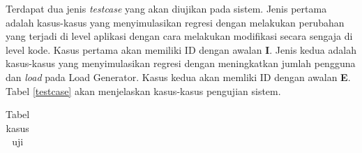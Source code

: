 Terdapat dua jenis \textit{testcase} yang akan diujikan pada sistem. Jenis pertama adalah kasus-kasus yang menyimulasikan regresi dengan melakukan perubahan yang terjadi di level aplikasi dengan cara melakukan modifikasi secara sengaja di level kode. Kasus pertama akan memiliki ID dengan awalan \textbf{I}. Jenis kedua adalah kasus-kasus yang menyimulasikan regresi dengan meningkatkan jumlah pengguna dan \textit{load} pada Load Generator. Kasus kedua akan memliki ID dengan awalan \textbf{E}. Tabel \ref{testcase} akan menjelaskan kasus-kasus pengujian sistem.
\begin{table}[]
	\caption{Tabel kasus uji}

	\begin{adjustwidth}{-1.2cm}{}
	
	\begin{tabular}{llccl}


\end{tabular}
\end{adjustwidth}
\end{table}
